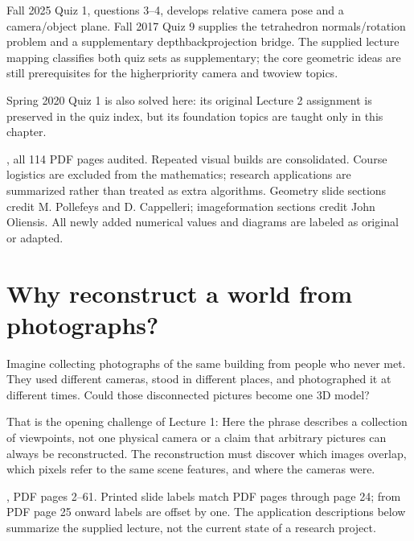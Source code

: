 \documentclass[letterpaper,11pt,english,openany,oneside]{jupyterBook}
\begin{document}
\sphinxAtStartPar
{}

\sphinxAtStartPar
Fall 2025 Quiz 1, questions 3–4, develops relative camera pose and a camera/object plane. Fall 2017 Quiz 9 supplies the tetrahedron normals/rotation problem and a supplementary depth\sphinxhyphen{}backprojection bridge. The supplied lecture mapping classifies both quiz sets as supplementary; the core geometric ideas are still prerequisites for the higher\sphinxhyphen{}priority camera and two\sphinxhyphen{}view topics.

\sphinxAtStartPar
Spring 2020 Quiz 1 is also solved here: its original Lecture 2 assignment is preserved in the quiz index, but its foundation topics are taught only in this chapter.

\sphinxAtStartPar
{} , all 114 PDF pages audited. Repeated visual builds are consolidated. Course logistics are excluded from the mathematics; research applications are summarized rather than treated as extra algorithms. Geometry slide sections credit M. Pollefeys and D. Cappelleri; image\sphinxhyphen{}formation sections credit John Oliensis. All newly added numerical values and diagrams are labeled as original or adapted.

\sphinxstepscope


\section{Why reconstruct a world from photographs?}
\label{\detokenize{lectures/lecture01/motivation:why-reconstruct-a-world-from-photographs}}\label{\detokenize{lectures/lecture01/motivation:lec01-motivation}}\label{\detokenize{lectures/lecture01/motivation::doc}}
\sphinxAtStartPar
Imagine collecting photographs of the same building from people who never met. They used different cameras, stood in different places, and photographed it at different times. Could those disconnected pictures become one 3D model?

\sphinxAtStartPar
That is the opening challenge of Lecture 1:  Here the phrase describes a collection of viewpoints, not one physical camera or a claim that arbitrary pictures can always be reconstructed. The reconstruction must discover which images overlap, which pixels refer to the same scene features, and where the cameras were.

\sphinxAtStartPar
{} , PDF pages 2–61. Printed slide labels match PDF pages through page 24; from PDF page 25 onward labels are offset by one. The application descriptions below summarize the supplied lecture, not the current state of a research project.
\end{document}
